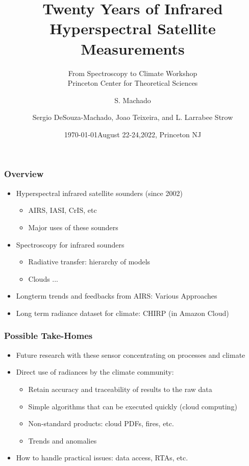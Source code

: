 \documentclass[10pt,t]{beamer}
\author{S. Machado}
\date{\today}
\title{\large Twenty Years of Infrared Hyperspectral Satellite Measurements}
\subtitle{\footnotesize{From Spectroscopy to Climate Workshop \\ \vspace{-0.07in} Princeton Center for Theoretical Sciences}}
\date{\vspace{0.1in}\footnotesize{August 22-24,2022, Princeton NJ \vfill}}
\author{Sergio DeSouza-Machado\inst{1}, Joao Teixeira\inst{2}, and L. Larrabee Strow\inst{1}}
\institute{\inst{1}UMBC Physics Department \and \inst{2}NASA Jet Propulsion Laboratory}
\begin{document}
\maketitle
\begin{frame}
  \frametitle{Overview}  
  \begin{itemize}
  \item Hyperspectral infrared satellite sounders (since 2002)
    \begin{itemize}
    \item AIRS, IASI, CrIS, etc
    \item Major uses of these sounders
    \end{itemize}
  \item Spectroscopy for infrared sounders
    \begin{itemize}
    \item Radiative transfer: hierarchy of models
    \item Clouds ...
    \end{itemize}
  \end{itemize}
  \begin{itemize}
  \item Longterm trends and feedbacks from AIRS: Various Approaches
  \item Long term radiance dataset for climate: CHIRP (in Amazon Cloud)
  \end{itemize}
\end{frame}
\begin{frame}
  \frametitle{Possible Take-Homes}
  \begin{itemize}
  \item Future research with these sensor concentrating on processes and climate
  \item Direct use of radiances by the climate community:
    \begin{itemize}
    \item Retain accuracy and traceability of results to the raw data
    \item Simple algorithms that can be executed quickly (cloud computing)
    \item Non-standard products: cloud PDFs, fires, etc.
    \item Trends and anomalies
    \end{itemize}
    \item How to handle practical issues: data access, RTAs, etc.
  \end{itemize}
\end{frame}
\end{document}
